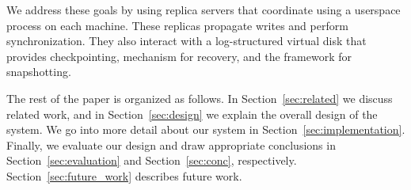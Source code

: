 We address these goals by using replica servers that coordinate using a
userspace process on each machine. These replicas propagate writes and 
perform synchronization. They also interact with a log-structured virtual 
disk that provides checkpointing, mechanism for recovery, and the 
framework for snapshotting. 

The rest of the paper is organized as follows. In Section~\ref{sec:related}
we discuss related work, and in Section~\ref{sec:design} we explain the 
overall design of the system. We go into more detail about our system in 
Section~\ref{sec:implementation}. Finally, we evaluate our design and draw
appropriate conclusions in Section~\ref{sec:evaluation} and 
Section~\ref{sec:conc}, respectively. Section~\ref{sec:future_work} describes future work.
